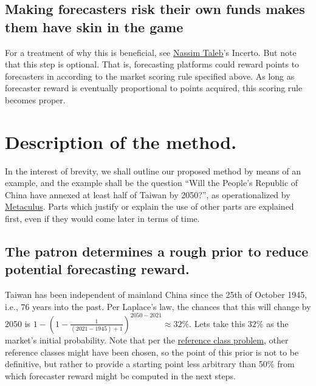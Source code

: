 \documentclass[]{article}
\begin{document}
\hypertarget{making-forecasters-risk-their-own-funds-makes-them-have-skin-in-the-game}{%
\subsection{Making forecasters risk their own funds makes them have skin
in the
game}\label{making-forecasters-risk-their-own-funds-makes-them-have-skin-in-the-game}}

For a treatment of why this is beneficial, see
\href{https://twitter.com/nntaleb}{Nassim Taleb}'s Incerto. But note
that this step is optional. That is, forecasting platforms could reward
points to forecasters in according to the market scoring rule specified
above. As long as forecaster reward is eventually proportional to points
acquired, this scoring rule becomes proper.

\hypertarget{description-of-the-method.}{%
\section{Description of the method.}\label{description-of-the-method.}}

In the interest of brevity, we shall outline our proposed method by
means of an example, and the example shall be the question ``Will the
People's Republic of China have annexed at least half of Taiwan by
2050?'', as operationalized by
\href{https://www.metaculus.com/questions/5320/chinese-annexation-of-most-of-taiwan-by-2050/}{Metaculus}.
Parts which justify or explain the use of other parts are explained
first, even if they would come later in terms of time.

\hypertarget{the-patron-determines-a-rough-prior-to-reduce-potential-forecasting-reward.}{%
\subsection{The patron determines a rough prior to reduce potential
forecasting
reward.}\label{the-patron-determines-a-rough-prior-to-reduce-potential-forecasting-reward.}}

Taiwan has been independent of mainland China since the 25th of October
1945, i.e., 76 years into the past. Per Laplace's law, the chances that
this will change by 2050 is
\(1-(1-\frac{1}{(2021-1945)+1})^{2050-2021} \approx 32\%\). Lets take
this \(32\%\) as the market's initial probability. Note that per the
\href{https://en.wikipedia.org/wiki/Reference_class_problem}{reference
class problem}, other reference classes might have been chosen, so the
point of this prior is not to be definitive, but rather to provide a
starting point less arbitrary than 50\% from which forecaster reward
might be computed in the next steps.
\end{document}
